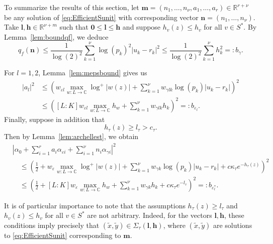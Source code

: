 \documentclass[11pt]{report}
\theoremstyle{definition}
\newcommand{\eps}{\varepsilon}
\begin{document}
To summarize the results of this section, let $\mathbf{m} = (n_1, \dots, n_{\nu}, a_1, \dots, a_r) \in \mathbb{R}^{r + \nu}$ be any solution of \eqref{eq:EfficientSunit} with corresponding vector $\mathbf{n} = (n_1, \dots, n_{\nu})$. Take $\mathbf{l},\mathbf{h}\in\mathbb{R}^{\nu+m}$ such that $\mathbf{0} \leq \mathbf{l} \leq \mathbf{h}$ and suppose $h_v(z)\leq h_v$ for all $v\in S^*$. By Lemma~\ref{lem:boundqf}, we deduce
\begin{equation} \label{def:bbound}
q_f(\mathbf{n}) \leq \frac{1}{\log(2)^2}\sum_{k = 1}^{\nu} \log(p_k)^2|u_k -r_k|^2 \leq \frac{1}{\log(2)^2}\sum_{k = 1}^{\nu} h_k^2=:b_{\gamma}.
\end{equation}

For $l = 1, 2$, Lemma~\ref{lem:mepsbound} gives us
\begin{align}\label{def:bepsbound}
|a_l|^2 &\leq \left(w_{\eps l}\max_{w:L \to \mathbb{C}} \log^+|w(z)| + \sum_{k = 1}^{\nu} w_{\gamma l k}\log(p_k)|u_k - r_k|\right)^2\\
	&\leq \left([L:K]w_{\eps l}\max_{w:L \to \mathbb{C}} h_w + \sum_{k = 1}^{\nu} w_{\gamma l k}h_k\right)^2 =: b_{\eps_l}.
\end{align}
Finally, suppose in addition that
\[h_{\tau}(z) \geq l_{\tau} > c_{\tau}.\]
Then by Lemma~\ref{lem:archellest}, we obtain
\begin{align} \label{def:bepstarbound}
& \left|\alpha_0+\sum_{i = 1}^r a_i \alpha_{\varepsilon i} + \sum_{i = 1}^{\nu} n_i \alpha_{\gamma i}\right|^2 \\
	& \quad \leq \left(\frac{1}{2} + w_{\eps} \max_{w :L \to \mathbb{C}}\log^+|w(z)| + \sum_{k = 1}^{\nu}w_{\gamma k} \log(p_k)|u_k - r_k| + c\kappa_{\tau}e^{-h_{\tau}(z)}\right)^2\\
	& \quad \leq \left(\frac{1}{2} + [L:K]w_{\eps} \max_{w :L \to \mathbb{C}}h_w + \sum_{k = 1}^{\nu}w_{\gamma k} h_k + c\kappa_{\tau}e^{-l_{\tau}}\right)^2 =:b_{\eps_l^*}.
\end{align}

It is of particular importance to note that the assumptions $h_{\tau}(z) \geq l_{\tau}$ and  $h_v(z)\leq h_v$ for all $v\in S^*$ are not arbitrary. Indeed, for the vectors $\mathbf{l}, \mathbf{h}$, these conditions imply precisely that $(\tilde{x},\tilde{y}) \in \Sigma_{\tau}(\mathbf{l}, \mathbf{h})$, where $(\tilde{x},\tilde{y})$ are solutions to \eqref{eq:EfficientSunit} corresponding to $\mathbf{m}$.
\end{document}

